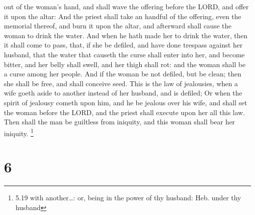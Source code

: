 out of the woman's hand, and shall wave the offering before the LORD,
and offer it upon the altar:  And the priest shall take an
handful of the offering, even the memorial thereof, and burn it upon the
altar, and afterward shall cause the woman to drink the water.
 And when he hath made her to drink the water, then it
shall come to pass, that, if she be defiled, and have done trespass
against her husband, that the water that causeth the curse shall enter
into her, and become bitter, and her belly shall swell, and her thigh
shall rot: and the woman shall be a curse among her people.
 And if the woman be not defiled, but be clean; then she
shall be free, and shall conceive seed.  This is the law of
jealousies, when a wife goeth aside to another instead of her husband,
and is defiled;  Or when the spirit of jealousy cometh upon
him, and he be jealous over his wife, and shall set the woman before the
LORD, and the priest shall execute upon her all this law. 
Then shall the man be guiltless from iniquity, and this woman shall bear
her iniquity. \footnote{5.19 with another\ldots: or, being in the power
  of thy husband: Heb. under thy husband}

\hypertarget{section-5}{%
\section{6}\label{section-5}}

